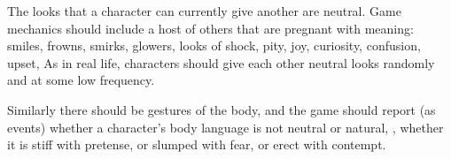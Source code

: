 The looks that a character can currently give another are neutral.
Game mechanics should include a host of others that are pregnant with meaning:
smiles, frowns, smirks, glowers, looks of shock, pity, joy,
curiosity, confusion, upset,
\etc\@ As in real life, characters should give each other neutral looks
randomly and at some low frequency.

Similarly there should be gestures of the body, and the game should report
(as events) whether a character's body language is not neutral or natural, \eg,
whether it is stiff with pretense, or slumped with fear, or erect with contempt.
